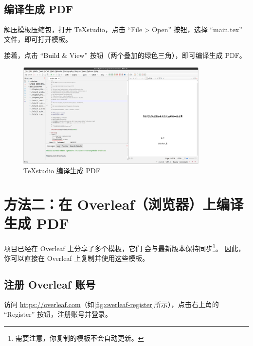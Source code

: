 \subsection{编译生成 PDF}

解压模板压缩包，打开 TeXstudio，点击 ``File > Open'' 按钮，选择 ``main.tex'' 文件，即可打开模板。

接着，点击 ``Build \& View'' 按钮（两个叠加的绿色三角），即可编译生成 PDF。

\begin{figure}[H]
  \begin{center}
    \includegraphics[width=0.85\textwidth]{imgs/texstudio-compile-and-view.png}
  \end{center}
  \caption{TeXstudio 编译生成 PDF}
  \label{fig:texstudio-compile-and-view}
\end{figure}

\section{方法二：在 Overleaf（浏览器）上编译生成 PDF}
\label{sec:overleaf-compile}

\BIThesis 项目已经在 Overleaf 上分享了多个模板，它们
会与最新版本保持同步\footnote{需要注意，你复制的模板不会自动更新。}。
因此，你可以直接在 Overleaf 上复制并使用这些模板。

\subsection{注册 Overleaf 账号}

访问 \url{https://overleaf.com}（如\autoref{fig:overleaf-register}所示），点击右上角的 ``Register'' 按钮，注册账号并登录。

